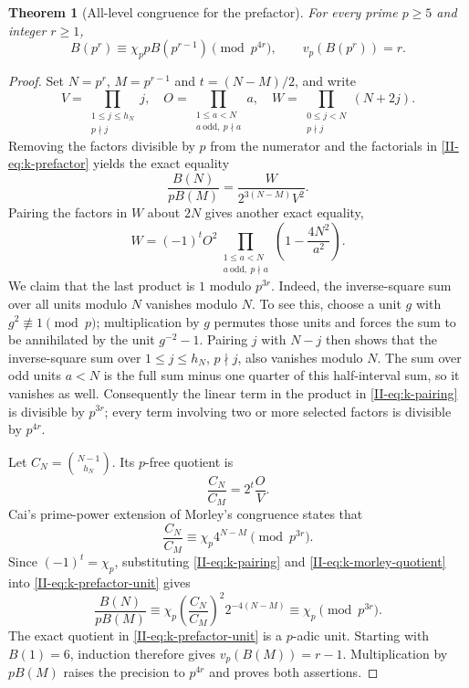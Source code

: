 \documentclass[11pt,letterpaper]{article}
\newtheorem{theorem}{Theorem}[section]
\numberwithin{equation}{section}
\begin{document}
\begin{theorem}[All-level congruence for the prefactor]
\label{II-thm:k-prefactor}
For every prime $p\ge5$ and integer $r\ge1$,
\begin{equation}\label{II-eq:k-prefactor-congruence}
 B(p^r)\equiv\chi_p pB(p^{r-1})\pmod{p^{4r}},
 \qquad v_p(B(p^r))=r.
\end{equation}
\end{theorem}
\begin{proof}
Set $N=p^r$, $M=p^{r-1}$ and $t=(N-M)/2$, and write
\[
 V=\prod_{\substack{1\le j\le h_N\\p\nmid j}}j,
 \quad O=\prod_{\substack{1\le a<N\\a\ \mathrm{odd},\ p\nmid a}}a,
 \quad W=\prod_{\substack{0\le j<N\\p\nmid j}}(N+2j).
\]
Removing the factors divisible by $p$ from the numerator and the
factorials in \eqref{II-eq:k-prefactor} yields the exact equality
\begin{equation}\label{II-eq:k-prefactor-unit}
 \frac{B(N)}{pB(M)}=\frac{W}{2^{3(N-M)}V^2}.
\end{equation}
Pairing the factors in $W$ about $2N$ gives another exact equality,
\begin{equation}\label{II-eq:k-pairing}
 W=(-1)^t O^2
 \prod_{\substack{1\le a<N\\a\ \mathrm{odd},\ p\nmid a}}
       \left(1-\frac{4N^2}{a^2}\right).
\end{equation}
We claim that the last product is $1$ modulo $p^{3r}$.
Indeed, the inverse-square sum over all units modulo $N$ vanishes
modulo $N$. To see this, choose a unit $g$ with $g^2\not\equiv1\pmod p$;
multiplication by $g$ permutes those units and forces the sum to be
annihilated by the unit $g^{-2}-1$. Pairing $j$ with $N-j$ then shows
that the inverse-square sum over $1\le j\le h_N$, $p\nmid j$, also
vanishes modulo $N$. The sum over odd units $a<N$ is the full sum
minus one quarter of this half-interval sum, so it vanishes as well.
Consequently the linear term in the product in \eqref{II-eq:k-pairing}
is divisible by $p^{3r}$; every term involving two or more selected
factors is divisible by $p^{4r}$.

Let $C_N=\binom{N-1}{h_N}$. Its $p$-free quotient is
\begin{equation}\label{II-eq:k-morley-quotient}
 \frac{C_N}{C_M}=2^t\frac{O}{V}.
\end{equation}
Cai's prime-power extension of Morley's congruence
\cite[Corollary~3]{II-Cai2002} states that
\[
 \frac{C_N}{C_M}\equiv\chi_p4^{N-M}\pmod{p^{3r}}.
\]
Since $(-1)^t=\chi_p$, substituting \eqref{II-eq:k-pairing} and
\eqref{II-eq:k-morley-quotient} into \eqref{II-eq:k-prefactor-unit} gives
\[
 \frac{B(N)}{pB(M)}
 \equiv\chi_p\left(\frac{C_N}{C_M}\right)^2
                  2^{-4(N-M)}
 \equiv\chi_p\pmod{p^{3r}}.
\]
The exact quotient in \eqref{II-eq:k-prefactor-unit} is a $p$-adic unit.
Starting with $B(1)=6$, induction therefore gives $v_p(B(M))=r-1$.
Multiplication by $pB(M)$ raises the precision to $p^{4r}$ and proves
both assertions.
\end{proof}
\end{document}
